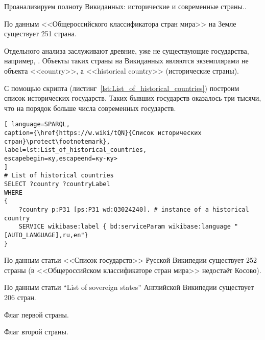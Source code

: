 Проанализируем полноту Викиданных: исторические и современные страны..

По данным <<Общероссийского классификатора стран мира>>\cite{oksm} на Земле существует 251 страна.

Отдельного анализа заслуживают древние, уже не существующие государства, например, . Объекты таких страны на Викиданных являются экземплярами не объекта <<country>>, а  <<historical country>> (исторические страны). 

С помощью скрипта (листинг~\ref{lst:List_of_historical_countries}) построим список исторических государств. Таких бывших государств оказалось три тысячи, что на порядок больше числа современных государств.

\begin{lstlisting}[ language=SPARQL, 
caption={\href{https://w.wiki/tQN}{Список исторических стран}\protect\footnotemark},
label=lst:List_of_historical_countries, 
escapebegin=ку,escapeend=ку-ку>
]
# List of historical countries
SELECT ?country ?countryLabel
WHERE
{
	?country p:P31 [ps:P31 wd:Q3024240]. # instance of a historical country 
	SERVICE wikibase:label { bd:serviceParam wikibase:language "[AUTO_LANGUAGE],ru,en"} 
}
\end{lstlisting}



По данным статьи <<Список государств>>\cite{list_of_sovereign_states} Русской Википедии существует 252 страны (в  <<Общероссийском классификаторе стран мира>> недостаёт Косово).

По данным статьи ``List of sovereign states''\cite{list_of_sovereign_states_en} Английской Википедии существует 206 стран.

\begin{marginfigure}[0.0cm]
	{
		\setlength{\fboxsep}{0pt}%
		\setlength{\fboxrule}{1pt}%
	}
	\caption{Флаг первой страны.}%
	\label{fig:flag_kor}%
\end{marginfigure}
\begin{marginfigure}[0.0cm]
	{
		\setlength{\fboxsep}{0pt}%
		\setlength{\fboxrule}{1pt}%
	}
	\caption{Флаг второй страны.}%
	\label{fig:flag_singapore}%
\end{marginfigure}


